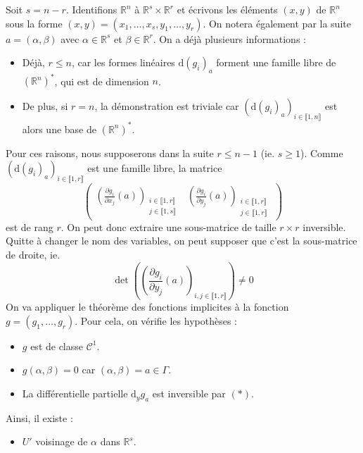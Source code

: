 	\begin{demonstration}
		Soit $s = n-r$. Identifions $\mathbb{R}^n$ à $\mathbb{R}^s \times \mathbb{R}^r$ et écrivons les éléments $(x, y)$ de $\mathbb{R}^n$ sous la forme $(x, y) = (x_1, \dots, x_s, y_1, \dots, y_r)$. On notera également par la suite $a = (\alpha, \beta)$ avec $\alpha \in \mathbb{R}^s$ et $\beta \in \mathbb{R}^r$. On a déjà plusieurs informations :
		\begin{itemize}
			\item Déjà, $r \leq n$, car les formes linéaires $\mathrm{d}(g_i)_a$ forment une famille libre de $(\mathbb{R}^n)^*$, qui est de dimension $n$.
			\item De plus, si $r = n$, la démonstration est triviale car $(\mathrm{d}(g_i)_a)_{i \in \llbracket 1, n \rrbracket}$ est alors une base de $(\mathbb{R}^n)^*$.
		\end{itemize}
		Pour ces raisons, nous supposerons dans la suite $r \leq n-1$ (ie. $s \geq 1$).
		\newpar
		Comme $(\mathrm{d}(g_i)_a)_{i \in \llbracket 1, r \rrbracket}$ est une famille libre, la matrice
		\[ \begin{pmatrix}
			\left( \frac{\partial g_i}{\partial x_j}(a) \right)_{\substack{i \in \llbracket 1, r \rrbracket \\ j \in \llbracket 1, s \rrbracket}} & \left( \frac{\partial g_i}{\partial y_j}(a) \right)_{\substack{i \in \llbracket 1, r \rrbracket \\ j \in \llbracket 1, r \rrbracket}}
		\end{pmatrix} \]
		est de rang $r$. On peut donc extraire une sous-matrice de taille $r \times r$ inversible. Quitte à changer le nom des variables, on peut supposer que c'est la sous-matrice de droite, ie.
		\[ \det \left( \left( \frac{\partial g_i}{\partial y_j}(a) \right)_{i, j \in \llbracket 1, r \rrbracket} \right) \neq 0 \tag{$*$} \]
		\newpar
		On va appliquer le théorème des fonctions implicites à la fonction $g = (g_1, \dots, g_r)$. Pour cela, on vérifie les hypothèses :
		\begin{itemize}
			\item $g$ est de classe $\mathcal{C}^1$.
			\item $g(\alpha, \beta) = 0$ car $(\alpha, \beta) = a \in \Gamma$.
			\item La différentielle partielle $\mathrm{d}_y g_a$ est inversible par $(*)$.
		\end{itemize}
		Ainsi, il existe :
		\begin{itemize}
			\item $U'$ voisinage de $\alpha$ dans $\mathbb{R}^s$.

\end{itemize}
\end{demonstration}
